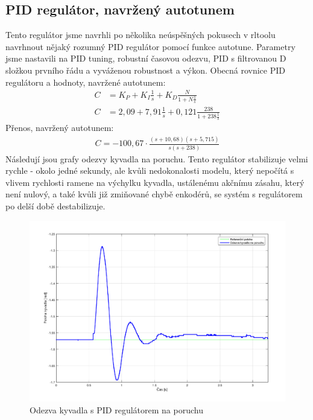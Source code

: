 \documentclass[11pt,a4paper]{article}
\begin{document}
\subsection{PID regulátor, navržený autotunem}
Tento regulátor jsme navrhli po několika neúspěšných pokusech v rltoolu navrhnout nějaký rozumný PID regulátor pomocí funkce autotune. Parametry jsme nastavili na PID tuning, robustní časovou odezvu, PID s filtrovanou D složkou prvního řádu a vyváženou robustnost a výkon.
\newline
Obecná rovnice PID regulátoru a hodnoty, navržené autotunem:
\begin{align*}
C &= K_P + K_I\frac{1}{s} + K_D\frac{N}{1+N\frac{1}{s}}	\\
C &= 2,09 + 7,91\frac{1}{s} + 0,121\frac{238}{1 + 238\frac{1}{s}}
\end{align*}
Přenos, navržený autotunem:
\begin{align*}
C = -100,67\cdot\frac{(s+10,68)(s+5,715)}{s(s+238)}
\end{align*}
Následují jsou grafy odezvy kyvadla na poruchu. Tento regulátor stabilizuje velmi rychle - okolo jedné sekundy, ale kvůli nedokonalosti modelu, který nepočítá s vlivem rychlosti ramene na výchylku kyvadla, ustálenému akčnímu zásahu, který není nulový, a také kvůli již zmiňované chybě enkodérů, se systém s regulátorem po delší době destabilizuje.
\begin{figure}[H]
	\centering
    \includegraphics[scale=0.55]{odezva_kyvadlo_PID}
    \caption{Odezva kyvadla s PID regulátorem na poruchu}
\end{figure}
\end{document}
